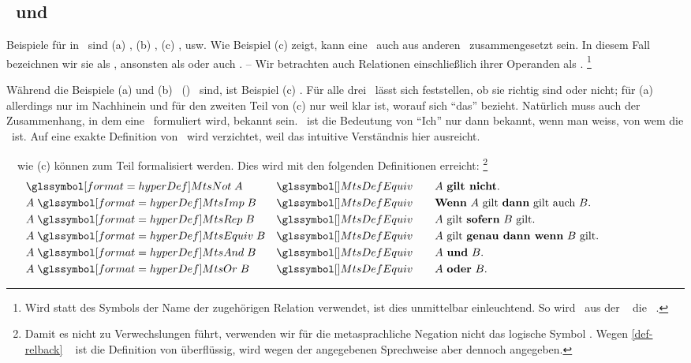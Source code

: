 \subsection[Aussagen und Metaoperationen]{\Aussagen\ und \Metaoperationen}%
\label  {sub-AussagenUndMetaoperationen}

Beispiele für  in \Metasprache\ sind
(a) ,
(b) ,
(c) , usw.
Wie Beispiel (c) zeigt, kann eine \Aussage\ auch aus anderen \Aussagen\ zusammengesetzt sein.
In diesem Fall bezeichnen wir sie als , ansonsten als  oder auch .
-- Wir betrachten auch Relationen einschließlich ihrer Operanden als \Aussagen.%
\footnote{%
	Wird statt des Symbols der Name der zugehörigen Relation verwendet, ist dies unmittelbar einleuchtend.
	So wird \textzB\ aus der \Formel\  die \Aussage\ .
}

Während die Beispiele (a) und (b) \unzerlegbare\ (\atomare) \Aussagen\ sind, ist Beispiel (c) \zerlegbar.
Für alle drei \Aussagen\ lässt sich feststellen, ob sie richtig sind oder nicht;
für (a) allerdings nur im Nachhinein und für den zweiten Teil von (c) nur weil klar ist, worauf sich "`das"' bezieht.
Natürlich muss auch der Zusammenhang, in dem eine \Aussage\ formuliert wird, bekannt sein.
\textZB\ ist die Bedeutung von "`Ich"' nur dann bekannt, wenn man weiss, von wem die \Aussage\ ist.
Auf eine exakte Definition von \Aussage\ wird verzichtet, weil das intuitive Verständnis hier ausreicht.

\Zerlegbare\ \Aussagen\ wie (c) können zum Teil formalisiert werden.
Dies wird mit den folgenden Definitionen erreicht:%
\footnote{%
	Damit es nicht zu Verwechslungen führt, verwenden wir für die metasprachliche Negation nicht das logische Symbol \chrqt{\FrmNot}.
	Wegen \eqref{def-relback} \pagename~\pageref{def-relback} ist die Definition von \chrqt{\MtsRep} überflüssig, wird wegen der angegebenen Sprechweise aber dennoch angegeben.
}
\begin{align}
	&    \defSymUna{\MtsNot}   A & \MtsDefEquiv \qquad &
	\text{$A$ \defFt{gilt nicht}.}
	\\
	& A \defSymBin{\MtsImp}   B & \MtsDefEquiv \qquad &
	\text{\defFt{Wenn} $A$ gilt \defFt{dann} gilt auch $B$.}
	\\
	& A \defSymBin{\MtsRep}   B & \MtsDefEquiv \qquad &
	\text{$A$ gilt \defFt{sofern} $B$ gilt.}
	\\
	& A \defSymBin{\MtsEquiv} B & \MtsDefEquiv \qquad &
	\text{$A$ gilt \defFt{genau dann wenn} $B$ gilt.}
	\\
	& A \defSymBin{\MtsAnd}   B & \MtsDefEquiv \qquad &
	\text{$A$ \defFt{und}  $B$.}
	\\
	& A \defSymBin{\MtsOr}    B & \MtsDefEquiv \qquad &
	\text{$A$ \defFt{oder} $B$.}
	\formulatoleft
\end{align}

